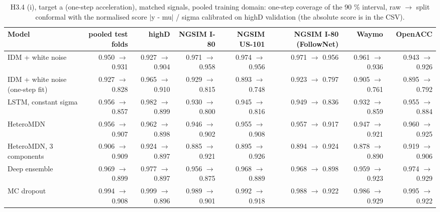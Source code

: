 \begin{table}[htbp]
\centering
\footnotesize
\caption{H3.4 (i), target a (one-step acceleration), matched signals, pooled training domain: one-step coverage of the 90 \% interval, raw $\rightarrow$ split conformal with the normalised score $|$y - mu$|$ / sigma calibrated on highD validation (the absolute score is in the CSV).}
\label{tab:t4-onestep-conformal--pool--a}
\begin{tabular}{lrrrrrrr}
\toprule
Model & pooled test folds & highD & NGSIM I-80 & NGSIM US-101 & NGSIM I-80 (FollowNet) & Waymo & OpenACC \\
\midrule
IDM + white noise & 0.950 $\rightarrow$ 0.931 & 0.927 $\rightarrow$ 0.904 & 0.971 $\rightarrow$ 0.958 & 0.974 $\rightarrow$ 0.956 & 0.971 $\rightarrow$ 0.956 & 0.961 $\rightarrow$ 0.936 & 0.943 $\rightarrow$ 0.926 \\
IDM + white noise (one-step fit) & 0.927 $\rightarrow$ 0.828 & 0.965 $\rightarrow$ 0.910 & 0.929 $\rightarrow$ 0.815 & 0.893 $\rightarrow$ 0.748 & 0.923 $\rightarrow$ 0.797 & 0.905 $\rightarrow$ 0.761 & 0.895 $\rightarrow$ 0.792 \\
LSTM, constant sigma & 0.956 $\rightarrow$ 0.857 & 0.982 $\rightarrow$ 0.899 & 0.930 $\rightarrow$ 0.800 & 0.945 $\rightarrow$ 0.816 & 0.949 $\rightarrow$ 0.836 & 0.932 $\rightarrow$ 0.859 & 0.955 $\rightarrow$ 0.884 \\
HeteroMDN & 0.956 $\rightarrow$ 0.907 & 0.962 $\rightarrow$ 0.898 & 0.946 $\rightarrow$ 0.902 & 0.955 $\rightarrow$ 0.908 & 0.957 $\rightarrow$ 0.917 & 0.947 $\rightarrow$ 0.921 & 0.960 $\rightarrow$ 0.925 \\
HeteroMDN, 3 components & 0.906 $\rightarrow$ 0.909 & 0.924 $\rightarrow$ 0.897 & 0.885 $\rightarrow$ 0.921 & 0.895 $\rightarrow$ 0.926 & 0.894 $\rightarrow$ 0.924 & 0.878 $\rightarrow$ 0.890 & 0.919 $\rightarrow$ 0.906 \\
Deep ensemble & 0.969 $\rightarrow$ 0.899 & 0.977 $\rightarrow$ 0.897 & 0.956 $\rightarrow$ 0.875 & 0.968 $\rightarrow$ 0.889 & 0.968 $\rightarrow$ 0.898 & 0.959 $\rightarrow$ 0.923 & 0.974 $\rightarrow$ 0.929 \\
MC dropout & 0.994 $\rightarrow$ 0.908 & 0.999 $\rightarrow$ 0.896 & 0.989 $\rightarrow$ 0.901 & 0.992 $\rightarrow$ 0.918 & 0.988 $\rightarrow$ 0.922 & 0.986 $\rightarrow$ 0.929 & 0.995 $\rightarrow$ 0.922 \\

\end{tabular}
\end{table}
